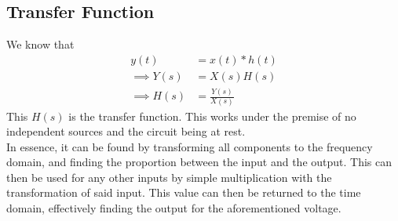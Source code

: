 \documentclass[nobib]{tufte-handout}
\begin{document}
\subsection{Transfer Function}
We know that
\begin{align*}
    y(t)          & = x(t)*h(t)         \\
    \implies Y(s) & = X(s)H(s)          \\
    \implies H(s) & = \frac{Y(s)}{X(s)}
\end{align*}
This $H(s)$ is the transfer function. This works under the premise of no independent sources and the circuit being at rest.\\
In essence, it can be found by transforming all components to the frequency domain, and finding the proportion between the input and the output. This can then be used for any other inputs by simple multiplication with the transformation of said input. This value can then be returned to the time domain, effectively finding the output for the aforementioned voltage.\\
\end{document}

